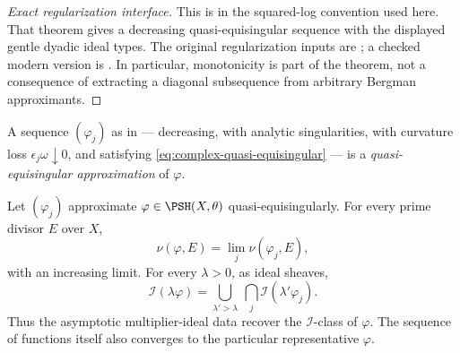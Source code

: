\begin{proof}[Exact regularization interface]
This is \cite[Theorem~1.6.2 and Definition~1.6.5]{XiaBook} in the
squared-log convention used here.  That theorem gives a decreasing
quasi-equisingular sequence with the displayed gentle dyadic ideal types.
The original regularization inputs are \cite{Dem92reg,DPS01}; a checked
modern version is \cite[Theorem~2.2 and Definition~2.4]{DXTraceV2}.
In particular, monotonicity is part of the theorem, not a consequence of
extracting a diagonal subsequence from arbitrary Bergman approximants.
\end{proof}

\begin{definition}
\label{def:ch51-quasi-equisingular}
A sequence $(\varphi_j)$ as in
 --- decreasing, with analytic
singularities, with curvature loss $\epsilon_j\omega\downarrow0$, and
satisfying \eqref{eq:complex-quasi-equisingular} --- is a
\emph{quasi-equisingular approximation} of $\varphi$.
\end{definition}

\begin{proposition}\label{prop:ch51-qes-preserves-i}
Let $(\varphi_j)$ approximate $\varphi\in\PSH(X,\theta)$
quasi-equisingularly.  For every prime divisor $E$ over $X$,
\[
 \nu(\varphi,E)=\lim_j\nu(\varphi_j,E),
\]
with an increasing limit.  For every $\lambda>0$, as ideal sheaves,
\[
 \mathcal I(\lambda\varphi)
 =\bigcup_{\lambda'>\lambda}\ \bigcap_j
                  \mathcal I(\lambda'\varphi_j).
\tag{51.14a}\label{eq:ch51-qes-ideal-recovery}
\]
Thus the asymptotic multiplier-ideal data recover the
$\mathcal I$-class of $\varphi$.  The sequence of functions itself also
converges to the particular representative $\varphi$.
\end{proposition}

